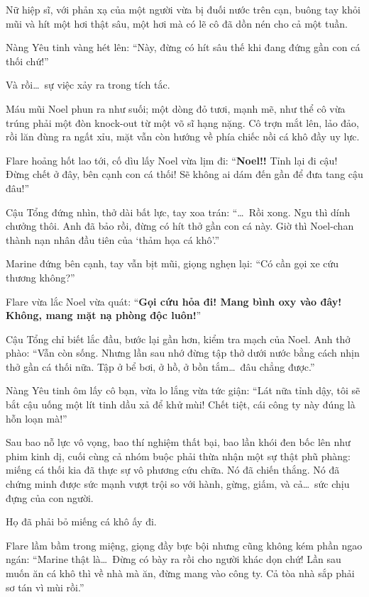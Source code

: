 \documentclass[../main.tex]{subfiles}
\begin{document}
Nữ hiệp sĩ, với phản xạ của một người vừa bị đuối nước trên cạn, buông tay khỏi mũi và hít một hơi thật sâu, một hơi mà có lẽ cô đã dồn nén cho cả một tuần.

Nàng Yêu tinh vàng hét lên: ``Này, đừng có hít sâu thế khi đang đứng gần con cá thối chứ!''

Và rồi\dots\ sự việc xảy ra trong tích tắc.


Máu mũi Noel phun ra như suối; một dòng đỏ tươi, mạnh mẽ, như thể cô vừa trúng phải một đòn knock-out từ một võ sĩ hạng nặng. Cô trợn mắt lên, lảo đảo, rồi lăn đùng ra ngất xỉu, mặt vẫn còn hướng về phía chiếc nồi cá khô đầy uy lực.

Flare hoảng hốt lao tới, cố dìu lấy Noel vừa lịm đi: ``\textbf{Noel!!} Tỉnh lại đi cậu! Đừng chết ở đây, bên cạnh con cá thối! Sẽ không ai dám đến gần để đưa tang cậu đâu!''

Cậu Tổng đứng nhìn, thở dài bất lực, tay xoa trán: ``\dots\ Rồi xong. Ngu thì dính chưởng thôi. Anh đã bảo rồi, đừng có hít thở gần con cá này. Giờ thì Noel-chan thành nạn nhân đầu tiên của `thảm họa cá khô'.''

Marine đứng bên cạnh, tay vẫn bịt mũi, giọng nghẹn lại: ``Có cần gọi xe cứu thương không?''

Flare vừa lắc Noel vừa quát: ``\textbf{Gọi cứu hỏa đi! Mang bình oxy vào đây! Không, mang mặt nạ phòng độc luôn!}''

Cậu Tổng chỉ biết lắc đầu, bước lại gần hơn, kiểm tra mạch của Noel. Anh thở phào: ``Vẫn còn sống. Nhưng lần sau nhớ đừng tập thở dưới nước bằng cách nhịn thở gần cá thối nữa. Tập ở bể bơi, ở hồ, ở bồn tắm\dots\ đâu chẳng được.''

Nàng Yêu tinh ôm lấy cô bạn, vừa lo lắng vừa tức giận: ``Lát nữa tỉnh dậy, tôi sẽ bắt cậu uống một lít tinh dầu xả để khử mùi! Chết tiệt, cái công ty này đúng là hỗn loạn mà!''

\ct

Sau bao nỗ lực vô vọng, bao thí nghiệm thất bại, bao lần khói đen bốc lên như phim kinh dị, cuối cùng cả nhóm buộc phải thừa nhận một sự thật phũ phàng: miếng cá thối kia đã thực sự vô phương cứu chữa. Nó đã chiến thắng. Nó đã chứng minh được sức mạnh vượt trội so với hành, gừng, giấm, và cả\dots\ sức chịu đựng của con người.

Họ đã phải bỏ miếng cá khô ấy đi.

Flare lầm bầm trong miệng, giọng đầy bực bội nhưng cũng không kém phần ngao ngán: ``Marine thật là\dots\ Đừng có bày ra rồi cho người khác dọn chứ! Lần sau muốn ăn cá khô thì về nhà mà ăn, đừng mang vào công ty. Cả tòa nhà sắp phải sơ tán vì mùi rồi.''
\end{document}
